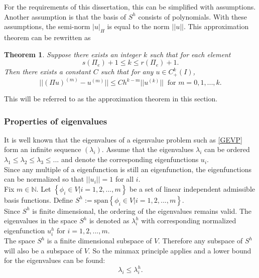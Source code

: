 \documentclass[../../main.tex]{subfiles}
\begin{document}
For the requirements of this dissertation, this can be simplified with assumptions. Another assumption is that the basis of $S^h$ consists of polynomials. With these assumptions, the semi-norm $|u|_H$ is equal to the norm $||u||$. This approximation theorem can be rewritten as
\newtheorem{Interpolation_2}{Theorem}
\begin{Interpolation_2}
	Suppose there exists an integer $k$ such that for each element
	\begin{equation*}
		s(\Pi_e) + 1 \leq k \leq r(\Pi_e) +1.
	\end{equation*}
	Then there exists a constant $C$ such that for any $u \in C^k_+(I)$,
	\begin{equation*}
		||(\Pi u)^{(m)} - u^{(m)}|| \leq C h^{k-m} || u^{(k)}|| \ \text{ for } m = 0,1,...,k.
	\end{equation*}
\end{Interpolation_2}

This will be referred to as the approximation theorem in this section.

\subsubsection*{Properties of eigenvalues}

It is well known that the eigenvalues of a eigenvalue problem such as \eqref{GEVP} form an infinite sequence $(\lambda_i)$. Assume that the eigenvalues $\lambda_i$ can be ordered $\lambda_1 \leq \lambda_2 \leq \lambda_3 \leq ...$ and denote the corresponding eigenfunctions $u_i$.\\

Since any multiple of a eigenfunction is still an eigenfunction, the eigenfunctions can be normalized so that $||u_i|| = 1$ for all $i$.\\

Fix $m \in \mathbb{N}$. \label{sym:natural} Let $\left\{ \phi_i \in V | i = 1,2,...,m \right\}$ be a set of linear independent admissible basis functions. Define $S^h := \text{span}\left\{\phi_i \in V | i = 1,2,...,m\right\}$.\\

Since $S^h$ is finite dimensional, the ordering of the eigenvalues remains valid. The eigenvalues in the space $S^h$ is denoted as $\lambda_i^h$ with corresponding normalized eigenfunction $u^h_i$ for $i = 1,2,...,m$.\\

The space $S^h$\label{sym:Sh1} is a finite dimensional subspace of $V$. Therefore any subspace of $S^h$ will also be a subspace of $V$. So the minmax principle applies and a lower bound for the eigenvalues can be found:
\begin{equation}
	\lambda_i \leq \lambda_i^h.
\end{equation}
\end{document}
